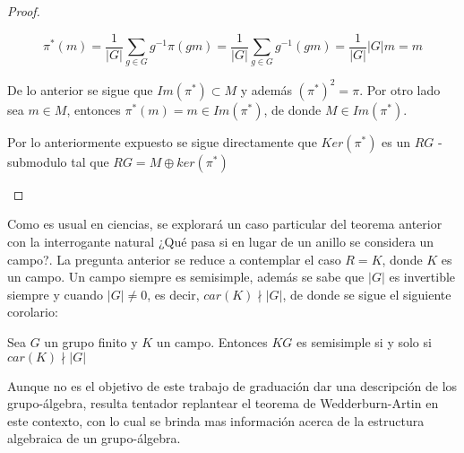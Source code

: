 \begin{proof}
\begin{itemize}
\[\pi ^* (m) = \frac{1}{|G|} \sum_{g \in G}g^{-1}\pi (gm) = \frac{1}{|G|} \sum_{g \in G}g^{-1}(gm) = \frac{1}{|G|}|G|m  = m\]

De lo anterior se sigue que $Im(\pi^*) \subset M$ y además $(\pi^*)^2 = \pi $. Por otro lado sea $m \in M$, entonces $\pi ^* (m) = m \in Im(\pi^*)$, de donde $M \in Im(\pi^*)$. 

Por lo anteriormente expuesto se sigue directamente que $Ker(\pi^*)$ es un $RG$ - submodulo tal que $RG = M \oplus ker(\pi^*)$  \qedhere

\end{itemize}
\end{proof} 

Como es usual en ciencias, se explorará un caso particular del teorema anterior con la interrogante natural ¿Qué pasa si en lugar de un anillo se considera un campo?. La pregunta anterior se reduce a contemplar el caso $R = K$, donde $K$ es un campo. Un campo siempre es semisimple, además se sabe que $|G|$ es invertible siempre y cuando $|G| \neq 0$, es decir, $car(K) \nmid |G|$, de donde se sigue el siguiente corolario:

\begin{corolario}
Sea $G$ un grupo finito y $K$ un campo. Entonces $KG$ es semisimple si y solo si $car(K) \nmid |G|$
\end{corolario}


Aunque no es el objetivo de este trabajo de graduación dar una descripción de los grupo-álgebra, resulta tentador replantear el teorema de Wedderburn-Artin en este contexto, con lo cual se brinda mas información acerca de la estructura algebraica de un grupo-álgebra.

